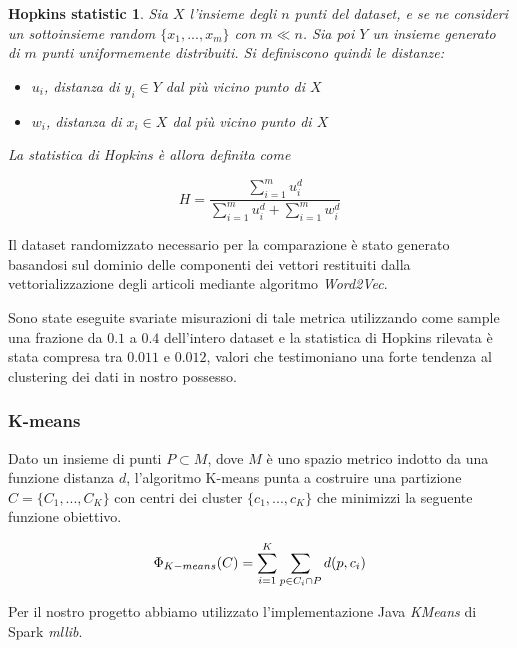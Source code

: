 \documentclass[
	11pt, %
	a4paper, %
	oneside, %
	headinclude,footinclude, %
	BCOR5mm, %
]{scrartcl}
\newtheorem*{hopkins}{Hopkins statistic} %
\begin{document}
			\vspace{5mm}
			\hfill\begin{minipage}{\dimexpr\textwidth-1cm}
			\begin{hopkins}
				Sia $X$ l'insieme degli $n$ punti del dataset, e se ne consideri un sottoinsieme random $\{x_1,...,x_m\}$ con $m \ll n$.
				Sia poi $Y$ un insieme generato di $m$ punti uniformemente distribuiti.
				Si definiscono quindi le distanze:
				\begin{itemize}
					\item $u_i$, distanza di $y_i \in Y$ dal pi\`{u} vicino punto di $X$
					\item $w_i$, distanza di $x_i \in X$ dal pi\`{u} vicino punto di $X$
				\end{itemize}
				La statistica di Hopkins è allora definita come
				
				$$H=\frac{\sum_{i=1}^m{u_i^d}}{\sum_{i=1}^m{u_i^d}+\sum_{i=1}^m{w_i^d}}$$
			\end{hopkins}
			\xdef\tpd{\the\prevdepth}
			\end{minipage}
			\vspace{5mm}
			
			Il dataset randomizzato necessario per la comparazione è stato generato basandosi sul dominio delle componenti dei vettori restituiti dalla vettorializzazione degli articoli mediante algoritmo \emph{Word2Vec}.

			Sono state eseguite svariate misurazioni di tale metrica utilizzando come sample una frazione da $0.1$ a $0.4$ dell'intero dataset e la statistica di Hopkins rilevata è stata compresa tra $0.011$ e $0.012$, valori che testimoniano una forte tendenza al clustering dei dati in nostro possesso.

		\subsubsection{K-means}
			Dato un insieme di punti $P \subset M$, dove $M$ è uno spazio metrico indotto da una funzione distanza $d$, l'algoritmo K-means punta a costruire una partizione $C = \{ C_1, ..., C_K \}$ con centri dei cluster $\{ c_1, ..., c_K\}$ che minimizzi la seguente funzione obiettivo.

			\begin{equation}
				\Phi_{K-means} (C) = \sum_{i=1}^K \sum_{p \in C_i \cap P} d(p, c_i) \\
			\end{equation}

			Per il nostro progetto abbiamo utilizzato l'implementazione Java \emph{KMeans} di Spark \emph{mllib}.
\end{document}
